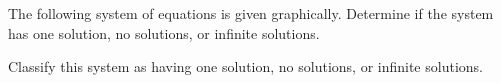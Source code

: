 \documentclass{ximera}
\author{Elizabeth Miller}
\begin{document}
The following system of equations is given graphically.  Determine if the system has one solution, no solutions, or infinite solutions.

\begin{image}
\end{image}

\begin{exercise}
Classify this system as having one solution, no solutions, or infinite solutions.
\begin{multipleChoice}  
\end{multipleChoice}  




\end{exercise}
\end{document}
